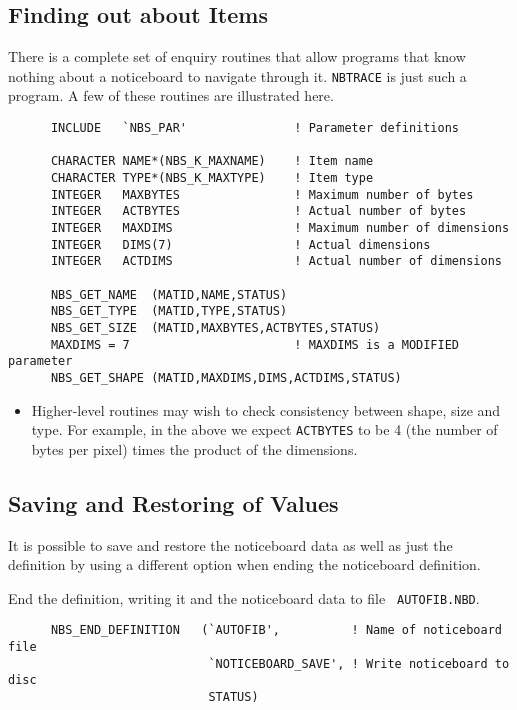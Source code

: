 \documentclass[twoside,11pt]{article}
\renewcommand{\_}{\texttt{\symbol{95}}}
\begin{document}
\subsection {Finding out about Items}

There is a complete set of enquiry routines that allow programs that know
nothing about a noticeboard to navigate through it. {\tt NBTRACE} is just such a
program. A few of these routines are illustrated here.

\begin {verbatim}
      INCLUDE   `NBS_PAR'               ! Parameter definitions

      CHARACTER NAME*(NBS_K_MAXNAME)    ! Item name
      CHARACTER TYPE*(NBS_K_MAXTYPE)    ! Item type
      INTEGER   MAXBYTES                ! Maximum number of bytes
      INTEGER   ACTBYTES                ! Actual number of bytes
      INTEGER   MAXDIMS                 ! Maximum number of dimensions
      INTEGER   DIMS(7)                 ! Actual dimensions
      INTEGER   ACTDIMS                 ! Actual number of dimensions

      NBS_GET_NAME  (MATID,NAME,STATUS)
      NBS_GET_TYPE  (MATID,TYPE,STATUS)
      NBS_GET_SIZE  (MATID,MAXBYTES,ACTBYTES,STATUS)
      MAXDIMS = 7                       ! MAXDIMS is a MODIFIED parameter
      NBS_GET_SHAPE (MATID,MAXDIMS,DIMS,ACTDIMS,STATUS)
\end{verbatim}

\begin {itemize}
\item Higher-level routines may wish to check consistency between shape, size
and type. For example, in the above we expect {\tt ACTBYTES} to be 4 (the number
of bytes per pixel) times the product of the dimensions.
\end {itemize}

\subsection {Saving and Restoring of Values}
\label {Saving and Restoring of Values}

It is possible to save and restore the noticeboard data as well as just the
definition by using a different option when ending the noticeboard definition.

End the definition, writing it and the noticeboard data to file {\tt
AUTOFIB.NBD}.

\begin {verbatim}
      NBS_END_DEFINITION   (`AUTOFIB',          ! Name of noticeboard file
                            `NOTICEBOARD_SAVE', ! Write noticeboard to disc
                            STATUS)
\end{verbatim}
\end{document}
